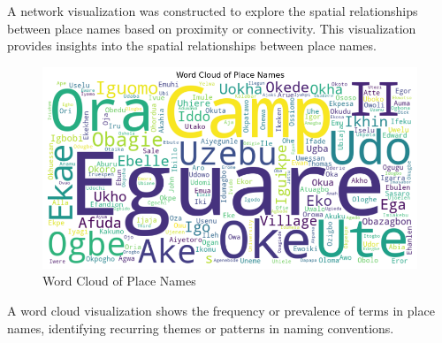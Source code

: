 A network visualization was constructed to explore the spatial relationships between place names based on proximity or connectivity. This visualization provides insights into the spatial relationships between place names.

\begin{figure}[htb]
    \centering
    \includegraphics[width=1\linewidth]{wordcloud.png}
    \caption{Word Cloud of Place Names}
    \label{fig:wordcloud}
\end{figure}
A word cloud visualization shows the frequency or prevalence of terms in place names, identifying recurring themes or patterns in naming conventions.

